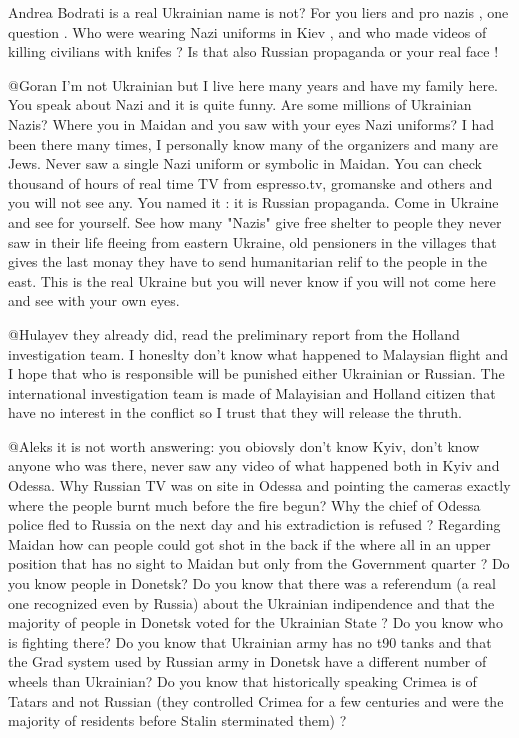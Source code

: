 \begin{itemize}
\begin{itemize}

Andrea Bodrati is a real Ukrainian name is not?
For you liers and pro nazis , one question .
Who were wearing Nazi uniforms in Kiev , and who made videos of killing civilians with knifes ?
Is that also Russian propaganda or your real face !


@Goran I'm not Ukrainian but I live here many years and have my family here.
You speak about Nazi and it is quite funny. Are some millions of Ukrainian
Nazis? Where you in Maidan and you saw with your eyes Nazi uniforms? I had been
there many times, I personally know many of the organizers and many are Jews.
Never saw a single Nazi uniform or symbolic in Maidan. You can check thousand
of hours of real time TV from espresso.tv, gromanske and others and you will
not see any. You named it : it is Russian propaganda. Come in Ukraine and see
for yourself. See how many "Nazis" give free shelter to people they never saw
in their life fleeing from eastern Ukraine, old pensioners in the villages that
gives the last monay they have to send humanitarian relif to the people in the
east. This is the real Ukraine but you will never know if you will not come
here and see with your own eyes.


@Hulayev they already did, read the preliminary report from the Holland
investigation team. I honeslty don't know what happened to Malaysian flight and
I hope that who is responsible will be punished either Ukrainian or Russian.
The international investigation team is made of Malayisian and Holland citizen
that have no interest in the conflict so I trust that they will release the
thruth.


@Aleks it is not worth answering: you obiovsly don't know Kyiv, don't know
anyone who was there, never saw any video of what happened both in Kyiv and
Odessa. Why Russian TV was on site in Odessa and pointing the cameras exactly
where the people burnt much before the fire begun? Why the chief of Odessa
police fled to Russia on the next day and his extradiction is refused ?
Regarding Maidan how can people could got shot in the back if the where all in
an upper position that has no sight to Maidan but only from the Government
quarter ? Do you know people in Donetsk? Do you know that there was a
referendum (a real one recognized even by Russia) about the Ukrainian
indipendence and that the majority of people in Donetsk voted for the Ukrainian
State ? Do you know who is fighting there? Do you know that Ukrainian army has
no t90 tanks and that the Grad system used by Russian army in Donetsk have a
different number of wheels than Ukrainian? Do you know that historically
speaking Crimea is of Tatars and not Russian (they controlled Crimea for a few
centuries and were the majority of residents before Stalin sterminated them) ?


\end{itemize}
\end{itemize}
